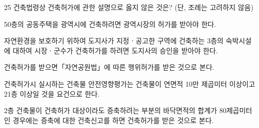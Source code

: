 \begin{question}{25}
건축법령상 건축허가에 관한 설명으로 옳지 않은 것은? (단, 조례는 고려하지 않음)
\begin{choices}
  \item 50층의 공동주택을 광역시에 건축하려면 광역시장의 허가를 받아야 한다.
  \item 자연환경을 보호하기 위하여 도지사가 지정ㆍ공고한 구역에 건축하는 3층의 숙박시설에 대하여 시장ㆍ군수가 건축허가를 하려면 도지사의 승인을 받아야 한다.
  \item 건축허가를 받으면「자연공원법」에 따른 행위허가를 받은 것으로 본다.
  \item 건축허가시 실시하는 건축물 안전영향평가는 건축물이 연면적 10만 제곱미터 이상이고 21층 이상일 것을 요건으로 한다.
  \item 2층 건축물이 건축허가 대상이라도 증축하려는 부분의 바닥면적의 합계가 80제곱미터인 경우에는 증축에 대한 건축신고를 하면 건축허가를 받은 것으로 본다.
\end{choices}
\end{question}
